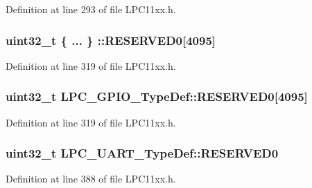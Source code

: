 Definition at line 293 of file L\+P\+C11xx.\+h.

\subsubsection[{\texorpdfstring{R\+E\+S\+E\+R\+V\+E\+D0}{RESERVED0}}]{\setlength{\rightskip}{0pt plus 5cm}uint32\+\_\+t \{ ... \} \+::R\+E\+S\+E\+R\+V\+E\+D0\mbox{[}4095\mbox{]}}\hypertarget{group___l_p_c11xx___definitions_gaebf6ef3eddb8171369c52cf409f5a90d}{}\label{group___l_p_c11xx___definitions_gaebf6ef3eddb8171369c52cf409f5a90d}


Definition at line 319 of file L\+P\+C11xx.\+h.

\subsubsection[{\texorpdfstring{R\+E\+S\+E\+R\+V\+E\+D0}{RESERVED0}}]{\setlength{\rightskip}{0pt plus 5cm}uint32\+\_\+t L\+P\+C\+\_\+\+G\+P\+I\+O\+\_\+\+Type\+Def\+::\+R\+E\+S\+E\+R\+V\+E\+D0\mbox{[}4095\mbox{]}}\hypertarget{group___l_p_c11xx___definitions_gaea82533d430cb89b9623ac026edc2517}{}\label{group___l_p_c11xx___definitions_gaea82533d430cb89b9623ac026edc2517}


Definition at line 319 of file L\+P\+C11xx.\+h.

\subsubsection[{\texorpdfstring{R\+E\+S\+E\+R\+V\+E\+D0}{RESERVED0}}]{\setlength{\rightskip}{0pt plus 5cm}uint32\+\_\+t L\+P\+C\+\_\+\+U\+A\+R\+T\+\_\+\+Type\+Def\+::\+R\+E\+S\+E\+R\+V\+E\+D0}\hypertarget{group___l_p_c11xx___definitions_ga83e56087b281e86c37a25efd473bad96}{}\label{group___l_p_c11xx___definitions_ga83e56087b281e86c37a25efd473bad96}


Definition at line 388 of file L\+P\+C11xx.\+h.

